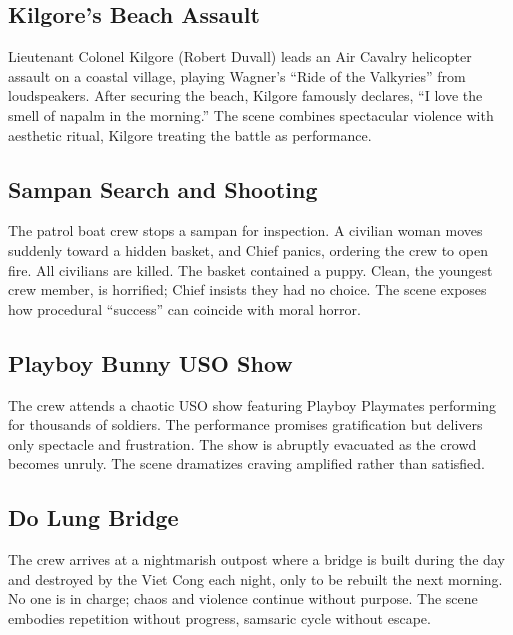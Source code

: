 \pagebreak[0]
\subsection*{Kilgore's Beach Assault}
\label{scene:kilgore-beach}

Lieutenant Colonel Kilgore (Robert Duvall) leads an Air Cavalry helicopter assault on a coastal
village, playing Wagner's ``Ride of the Valkyries'' from loudspeakers. After securing the
beach, Kilgore famously declares, ``I love the smell of napalm in the morning.'' The scene
combines spectacular violence with aesthetic ritual, Kilgore treating the battle as
performance.

\subsection*{Sampan Search and Shooting}
\label{scene:sampan}

The patrol boat crew stops a sampan for inspection. A civilian woman moves suddenly toward a
hidden basket, and Chief panics, ordering the crew to open fire. All civilians are killed. The
basket contained a puppy. Clean, the youngest crew member, is horrified; Chief insists they
had no choice. The scene exposes how procedural ``success'' can coincide with moral horror.

\pagebreak[0]
\subsection*{Playboy Bunny USO Show}
\label{scene:playboy-show}

The crew attends a chaotic USO show featuring Playboy Playmates performing for thousands of
soldiers. The performance promises gratification but delivers only spectacle and frustration.
The show is abruptly evacuated as the crowd becomes unruly. The scene dramatizes craving
amplified rather than satisfied.

\subsection*{Do Lung Bridge}
\label{scene:do-lung-bridge}

The crew arrives at a nightmarish outpost where a bridge is built during the day and destroyed
by the Viet Cong each night, only to be rebuilt the next morning. No one is in charge; chaos
and violence continue without purpose. The scene embodies repetition without progress, samsaric
cycle without escape.

